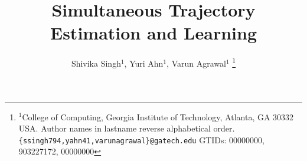 \documentclass[letterpaper, 10 pt, conference]{ieeeconf}  %
\title{\LARGE \bf
    Simultaneous Trajectory Estimation and Learning
}
\author{Shivika Singh$^{1}$, Yuri Ahn$^{1}$, Varun Agrawal$^{1}$%
    \thanks{$^{1}$College of Computing, Georgia Institute of Technology, Atlanta, GA 30332 USA. Author names in lastname reverse alphabetical order.
        {\tt\small \{ssingh794,yahn41,varunagrawal\}@gatech.edu}
        GTIDs: 00000000, 903227172, 00000000}%
}
\begin{document}
    
    
    
    \maketitle
    \thispagestyle{empty}
    \pagestyle{empty}
    
    
    \begin{abstract}
    \end{abstract}
    
    
    
    
    
    
    
    
    
    
    
    \newpage
    \printbibliography
    
    
\end{document}
